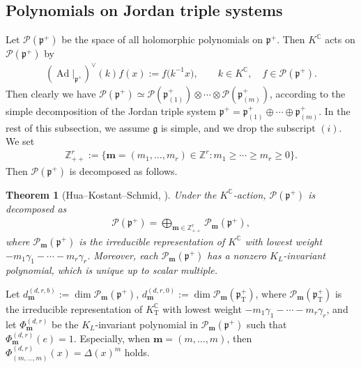 \documentclass[pdftex]{sigma}
\numberwithin{equation}{section}
\newtheorem{Theorem}{Theorem}[section]
\newcommand{\bm}{\mathbf{m}}
\newcommand{\BZ}{\mathbb{Z}}
\newcommand{\BC}{\mathbb{C}}
\newcommand{\fg}{\mathfrak{g}}
\newcommand{\fp}{\mathfrak{p}}
\newcommand{\cP}{\mathcal{P}}
\newcommand{\rT}{\mathrm{T}}
\begin{document}
\subsection{Polynomials on Jordan triple systems}
Let $\cP(\fp^+)$ be the space of all holomorphic polynomials on $\fp^+$. Then $K^\BC$ acts on $\cP(\fp^+)$ by
\begin{gather*} (\operatorname{Ad}|_{\fp^+})^\vee(k)f(x):=f\big(k^{-1}x\big), \qquad k\in K^\BC,\quad f\in\cP(\fp^+). \end{gather*}
Then clearly we have $\cP(\fp^+)\simeq \cP(\fp^+_{(1)})\otimes\cdots\otimes\cP(\fp^+_{(m)})$, according to the
simple decomposition of the Jordan triple system $\fp^+=\fp^+_{(1)}\oplus\cdots\oplus\fp^+_{(m)}$.
In the rest of this subsection, we assume $\fg$ is simple, and we drop the subscript $(i)$. We set
\begin{gather*} \BZ_{++}^r:=\big\{\bm=(m_1,\ldots,m_r)\in\BZ^r\colon m_1\ge \cdots \ge m_r\ge 0\big\}. \end{gather*}
Then $\cP(\fp^+)$ is decomposed as follows.
\begin{Theorem}[Hua--Kostant--Schmid, {\cite[Part~III, Theorem~V.2.1]{FKKLR}}]\label{HKS}
Under the $K^\BC$-action, $\cP(\fp^+)$ is decomposed as
\begin{gather*} \cP(\fp^+)=\bigoplus_{\bm\in\BZ^{r}_{++}}\cP_\bm(\fp^+), \end{gather*}
where $\cP_\bm(\fp^+)$ is the irreducible representation of $K^\BC$ with lowest weight
$-m_1\gamma_1-\cdots-m_r\gamma_r$. Moreover, each $\cP_\bm(\fp^+)$ has a nonzero $K_L$-invariant polynomial,
which is unique up to scalar multiple.
\end{Theorem}
Let $d_\bm^{(d,r,b)}:=\dim\cP_\bm(\fp^+)$, $d_\bm^{(d,r,0)}:=\dim\cP_\bm(\fp^+_\rT)$,
where $\cP_\bm(\fp^+_\rT)$ is the irreducible representation of $K^\BC_\rT$ with lowest weight $-m_1\gamma_1-\cdots-m_r\gamma_r$,
and let $\Phi_\bm^{(d,r)}$ be the $K_L$-invariant polynomial in $\cP_\bm(\fp^+)$
such that $\Phi_\bm^{(d,r)}(e)=1$. Especially, when $\bm=(m,\ldots,m)$, then $\Phi_{(m,\ldots,m)}^{(d,r)}(x)=\Delta(x)^m$ holds.
\end{document}
